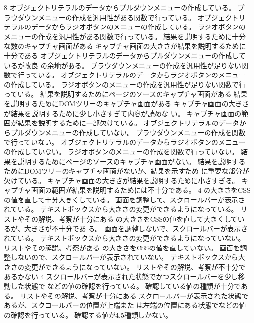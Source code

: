 {
{}{8}
 {
 {オブジェクトリテラルのデータからプルダウンメニューの作成している。}
 {プラウダウンメニューの作成を汎用性がある関数で行っている。}
 {オブジェクトリテラルのデータからラジオボタンのメニューの作成している。}
 {ラジオボタンのメニューの作成を汎用性がある関数で行っている。}
 {結果を説明するために十分な数のキャプチャ画面がある}
 {キャプチャ画面の大きさが結果を説明するために十分である}
 }
 {
 {オブジェクトリテラルのデータからプルダウンメニューの作成しているが改良
 の余地がある。}
 {プラウダウンメニューの作成を汎用性が足りない関数で行っている。}
 {オブジェクトリテラルのデータからラジオボタンのメニューの作成している。}
 {ラジオボタンのメニューの作成を汎用性が足りない関数で行っている。}
 {結果を説明するためにページのソースのキャプチャ画面がある}
 {結果を説明するためにDOMツリーのキャプチャ画面がある}
 {キャプチャ画面の大きさが結果を説明するために少し小さすぎて内容が読めな
 い。}
 {キャプチャ画面の範囲が結果を説明するために一部欠けている。}
 }
 {
 {オブジェクトリテラルのデータからプルダウンメニューの作成していない。}
 {プラウダウンメニューの作成を関数で行っていない。}
 {オブジェクトリテラルのデータからラジオボタンのメニューの作成していない。}
 {ラジオボタンのメニューの作成を関数で行っていない。}
 {結果を説明するためにページのソースのキャプチャ画面がない。}
 {結果を説明するためにDOMツリーのキャプチャ画面がないか、結果を示すため
 に重要な部分が欠けている。}
 {キャプチャ画面の大きさが結果を説明するために小さすぎる。}
 {キャプチャ画面の範囲が結果を説明するためには不十分である。}
 }
 {}{4}
 {
 {の大きさをCSSの値を直して十分大きくしている。}
 {画面を調整して、スクロールバーが表示されている。}
 {テキストボックスから大きさの変更ができるようになっている。}
 {リストやその解説、考察が十分にある}
 }
 {
 {の大きさをCSSの値を直して大きくしているが、大きさが不十分であ
 る。}
 {画面を調整しないで、スクロールバーが表示されている。}
 {テキストボックスから大きさの変更ができるようになっていない。}
 {リストやその解説、考察がある}
 }
 {
 {の大きさをCSSの値を直していない。}
 {画面を調整しないので、スクロールバーが表示されていない。}
 {テキストボックスから大きさの変更ができるようになっていない。}
 {リストやその解説、考察が不十分であるかない}
 }
 {}{4}
 {
 {スクロールバーが表示された状態でかつスクロールバーを少し移動した状態で
 などの値の確認を行っている。}
 {確認している値の種類が十分である。}
 {リストやその解説、考察が十分にある}
 }
 {
 {スクロールバーが表示された状態であるが、スクロールバーの位置が上端また
 は左端の位置にある状態でなどの値の確認を行っている。}
 {確認する値が4,5種類しかない。}
}}
